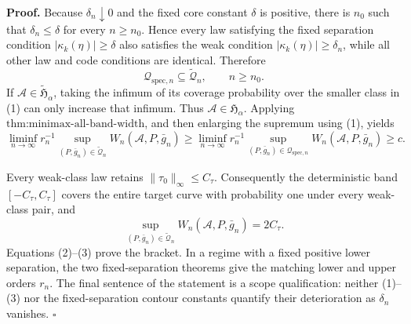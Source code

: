 \textbf{Proof.}
Because \(\delta_n\downarrow0\) and the fixed core constant \(\delta\) is positive, there is \(n_0\) such that \(\delta_n\le\delta\) for every \(n\ge n_0\).  Hence every law satisfying the fixed separation condition \(|\kappa_k(\eta)|\ge\delta\) also satisfies the weak condition \(|\kappa_k(\eta)|\ge\delta_n\), while all other law and code conditions are identical.  Therefore
\[
 \mathcal Q_{\mathrm{spec},n}\subseteq\widetilde{\mathcal Q}_n,
 \qquad n\ge n_0. \tag{1}
\]
If \(\mathcal A\in\widetilde{\mathfrak H}_\alpha\), taking the infimum of its coverage probability over the smaller class in (1) can only increase that infimum.  Thus \(\mathcal A\in\mathfrak H_\alpha\).  Applying \(\text{thm:minimax-all-band-width}\), and then enlarging the supremum using (1), yields
\[
 \liminf_{n\to\infty}r_n^{-1}
 \sup_{(P,\bar g_n)\in\widetilde{\mathcal Q}_n}W_n(\mathcal A,P,\bar g_n)
 \ge
 \liminf_{n\to\infty}r_n^{-1}
 \sup_{(P,\bar g_n)\in\mathcal Q_{\mathrm{spec},n}}W_n(\mathcal A,P,\bar g_n)
 \ge c. \tag{2}
\]

Every weak-class law retains \(\|\tau_0\|_\infty\le C_\tau\).  Consequently the deterministic band \([-C_\tau,C_\tau]\) covers the entire target curve with probability one under every weak-class pair, and
\[
 \sup_{(P,\bar g_n)\in\widetilde{\mathcal Q}_n}
 W_n(\mathcal A,P,\bar g_n)=2C_\tau. \tag{3}
\]
Equations (2)--(3) prove the bracket.  In a regime with a fixed positive lower separation, the two fixed-separation theorems give the matching lower and upper orders \(r_n\).  The final sentence of the statement is a scope qualification: neither (1)--(3) nor the fixed-separation contour constants quantify their deterioration as \(\delta_n\) vanishes. \(\square\)